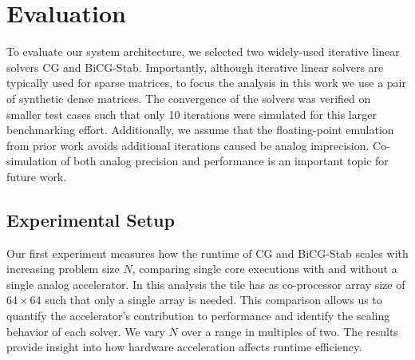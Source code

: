 \documentclass[sigconf, review]{acmart}
\begin{document}
\begin{abstract}

\end{abstract}


\maketitle






\section{Evaluation}


To evaluate our system architecture, we selected two widely-used iterative linear solvers CG and BiCG-Stab.
Importantly, although iterative linear solvers are typically used for sparse matrices, to focus the analysis in this work we use a pair of synthetic dense matrices.
The convergence of the solvers was verified on smaller test cases such that only 10 iterations were simulated for this larger benchmarking effort.
Additionally, we assume that the floating-point emulation from prior work avoids additional iterations caused be analog imprecision.
Co-simulation of both analog precision and performance is an important topic for future work.

\subsection{Experimental Setup}

Our first experiment measures how the runtime of CG and BiCG-Stab scales with increasing problem size $N$, comparing single core executions with and without a single analog accelerator.
In this analysis the tile has as co-processor array size of $64\times64$ such that only a single array is needed.
This comparison allows us to quantify the accelerator’s contribution to performance and identify the scaling behavior of each solver.
We vary $N$ over a range in multiples of two. 
The results provide insight into how hardware acceleration affects runtime efficiency.
\end{document}
